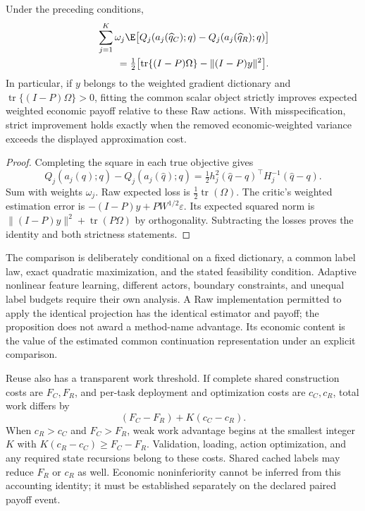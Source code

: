 \begin{proposition}
\label{prop:r16decisionvalue}
Under the preceding conditions,
\begin{equation}
\begin{split}
 &\sum_{j=1}^K\omega_j\E\bigl[Q_j(a_j(\widehat q_C);q)
                          -Q_j(a_j(\widehat q_R);q)\bigr]\\
 &\qquad=\tfrac12\bigl[\operatorname{tr}\{(I-P)\Omega\}
                          -\|(I-P)y\|^2\bigr].
\end{split}\label{eq:r16decisionvalue}
\end{equation}
In particular, if $y$ belongs to the weighted gradient dictionary and
$\operatorname{tr}\{(I-P)\Omega\}>0$, fitting the common scalar object strictly improves expected weighted economic payoff relative to these Raw actions. With misspecification, strict improvement holds exactly when the removed economic-weighted variance exceeds the displayed approximation cost.
\end{proposition}
\begin{proof}
Completing the square in each true objective gives
\[
 Q_j(a_j(q);q)-Q_j(a_j(\widehat q);q)
  =\tfrac12h_j^2(\widehat q-q)^\top H_j^{-1}(\widehat q-q).
\]
Sum with weights $\omega_j$. Raw expected loss is $\tfrac12\operatorname{tr}(\Omega)$. The critic's weighted estimation error is $-(I-P)y+PW^{1/2}\varepsilon$. Its expected squared norm is $\|(I-P)y\|^2+\operatorname{tr}(P\Omega)$ by orthogonality. Subtracting the losses proves the identity and both strictness statements.
\end{proof}

The comparison is deliberately conditional on a fixed dictionary, a common label law, exact quadratic maximization, and the stated feasibility condition. Adaptive nonlinear feature learning, different actors, boundary constraints, and unequal label budgets require their own analysis. A Raw implementation permitted to apply the identical projection has the identical estimator and payoff; the proposition does not award a method-name advantage. Its economic content is the value of the estimated common continuation representation under an explicit comparison.

Reuse also has a transparent work threshold. If complete shared construction costs are $F_C,F_R$, and per-task deployment and optimization costs are $c_C,c_R$, total work differs by
\[
 (F_C-F_R)+K(c_C-c_R).
\]
When $c_R>c_C$ and $F_C>F_R$, weak work advantage begins at the smallest integer $K$ with $K(c_R-c_C)\ge F_C-F_R$. Validation, loading, action optimization, and any required state recursions belong to these costs. Shared cached labels may reduce $F_R$ or $c_R$ as well. Economic noninferiority cannot be inferred from this accounting identity; it must be established separately on the declared paired payoff event.
